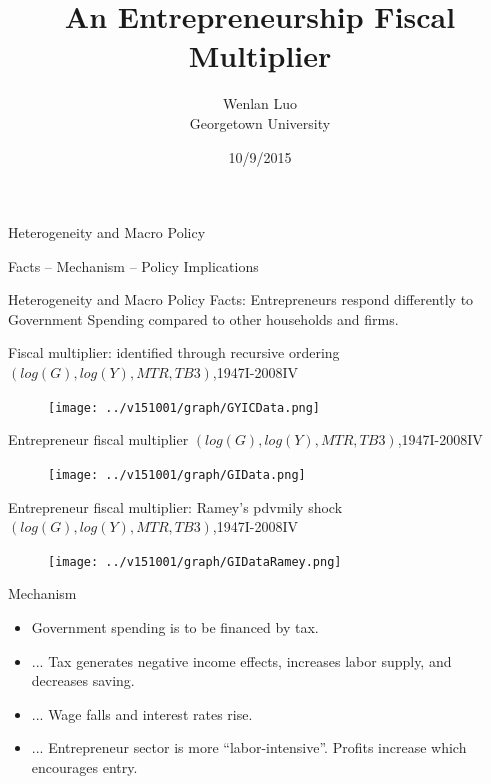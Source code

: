 \documentclass[svgnames]{beamer}
\begin{document}
\begin{frame}
\title {An Entrepreneurship Fiscal Multiplier}
\author {Wenlan Luo \\ Georgetown University}
\date{10/9/2015}
\maketitle
\end{frame}

\begin{frame}
\centerline{{\color{blue}Heterogeneity} and {\color{red}Macro Policy}}
\centerline{{Facts} -- {Mechanism} -- {Policy Implications}}
\end{frame}

\begin{frame}{{\color{blue}Heterogeneity} and {\color{red}Macro Policy}}
Facts: {\color{blue} Entrepreneurs} respond differently to {\color{red} Government Spending} compared to other households and firms.
\end{frame}

\begin{frame}{Fiscal multiplier: identified through recursive ordering}
{$(log(G),log(Y),MTR,TB3)$,1947I-2008IV}
\begin{figure}[!ht]
\texttt{[image: ../v151001/graph/GYICData.png]}
\end{figure}
\end{frame}

\begin{frame}{Entrepreneur fiscal multiplier}
{$(log(G),log(Y),MTR,TB3)$,1947I-2008IV}
\begin{figure}[!ht]
\texttt{[image: ../v151001/graph/GIData.png]}
\end{figure}
\end{frame}

\begin{frame}{Entrepreneur fiscal multiplier: Ramey's pdvmily shock}
{$(log(G),log(Y),MTR,TB3)$,1947I-2008IV}
\begin{figure}[!ht]
\texttt{[image: ../v151001/graph/GIDataRamey.png]}
\end{figure}
\end{frame}

\begin{frame}{Mechanism}
\begin{itemize}
\item Government spending is to be financed by tax.
\item ... Tax generates negative income effects, increases labor supply, and decreases saving.
\item ... Wage falls and interest rates rise.
\item ... Entrepreneur sector is more ``labor-intensive''. Profits increase which encourages entry.
\end{itemize}
\end{frame}
\end{document}
